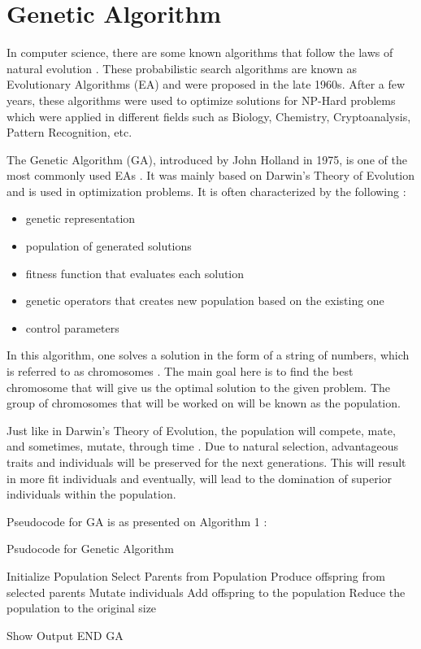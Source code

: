 \section{Genetic Algorithm}
\indent \indent In computer science, there are some known algorithms that follow the laws of natural evolution \cite{larranaga1999genetic}. These probabilistic search algorithms are known as Evolutionary  Algorithms (EA) and were proposed in the late 1960s. After a few years, these algorithms were used to optimize solutions for NP-Hard problems which were applied in different fields such as Biology, Chemistry, Cryptoanalysis, Pattern Recognition, etc.  \par 

The Genetic Algorithm (GA), introduced by John Holland in 1975, is one of the most commonly used EAs \cite{reeves2003genetic}. It was mainly based on Darwin's Theory of Evolution and is used in optimization problems. It is often characterized by the following \cite{srinivas1994adaptive}:
\begin{itemize}
	\item genetic representation
	\item population of generated solutions
	\item fitness function that evaluates each solution
	\item genetic operators that creates new population based on the existing one
	\item control parameters
\end{itemize}\par 


In this algorithm, one solves a solution in the form of a string of numbers, which is referred to as chromosomes \cite{larranaga1999genetic}. The main goal here is to find the best chromosome that will give us the optimal solution to the given problem. The group of chromosomes that will be worked on will be known as the population. \par 

Just like in Darwin's Theory of Evolution, the population will compete, mate, and sometimes, mutate, through time \cite{maad2016genetic}. Due to natural selection, advantageous traits and individuals will be  preserved for the next generations. This will result in more fit individuals and eventually, will lead to the domination of superior individuals within the population.\par 
Pseudocode for GA is as presented on Algorithm 1 \cite{bodenhofer2003genetic}:
\begin{algorithm}
\begin{algorithmic}
	\caption{Psudocode for Genetic Algorithm}
	\State Initialize Population 
	\State Select Parents from Population 
	\State Produce offspring from selected parents  
	\State Mutate individuals
	\State Add offspring to the population
	\State Reduce the population to the original size  
	
	\EndWhile
	\State Show Output 
	\State END GA  
\end{algorithmic}
\end{algorithm}


